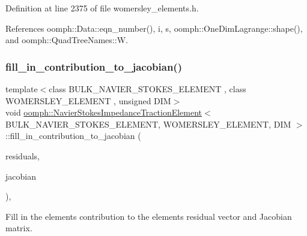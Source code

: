 Definition at line 2375 of file womersley\+\_\+elements.\+h.



References oomph\+::\+Data\+::eqn\+\_\+number(), i, s, oomph\+::\+One\+Dim\+Lagrange\+::shape(), and oomph\+::\+Quad\+Tree\+Names\+::W.

\mbox{\label{classoomph_1_1NavierStokesImpedanceTractionElement_a708121c1a4224d0d2c572904f74f2fb6}} 
\subsubsection{\texorpdfstring{fill\+\_\+in\+\_\+contribution\+\_\+to\+\_\+jacobian()}{fill\_in\_contribution\_to\_jacobian()}}
{\footnotesize\ttfamily template$<$class B\+U\+L\+K\+\_\+\+N\+A\+V\+I\+E\+R\+\_\+\+S\+T\+O\+K\+E\+S\+\_\+\+E\+L\+E\+M\+E\+NT , class W\+O\+M\+E\+R\+S\+L\+E\+Y\+\_\+\+E\+L\+E\+M\+E\+NT , unsigned D\+IM$>$ \\
void \hyperlink{classoomph_1_1NavierStokesImpedanceTractionElement}{oomph\+::\+Navier\+Stokes\+Impedance\+Traction\+Element}$<$ B\+U\+L\+K\+\_\+\+N\+A\+V\+I\+E\+R\+\_\+\+S\+T\+O\+K\+E\+S\+\_\+\+E\+L\+E\+M\+E\+NT, W\+O\+M\+E\+R\+S\+L\+E\+Y\+\_\+\+E\+L\+E\+M\+E\+NT, D\+IM $>$\+::fill\+\_\+in\+\_\+contribution\+\_\+to\+\_\+jacobian (\begin{DoxyParamCaption}\item[{\hyperlink{classoomph_1_1Vector}{Vector}$<$ double $>$ \&}]{residuals,  }\item[{\hyperlink{classoomph_1_1DenseMatrix}{Dense\+Matrix}$<$ double $>$ \&}]{jacobian }\end{DoxyParamCaption})\hspace{0.3cm}{\ttfamily [inline]}, {\ttfamily [virtual]}}



Fill in the element\textquotesingle{}s contribution to the element\textquotesingle{}s residual vector and Jacobian matrix. 



